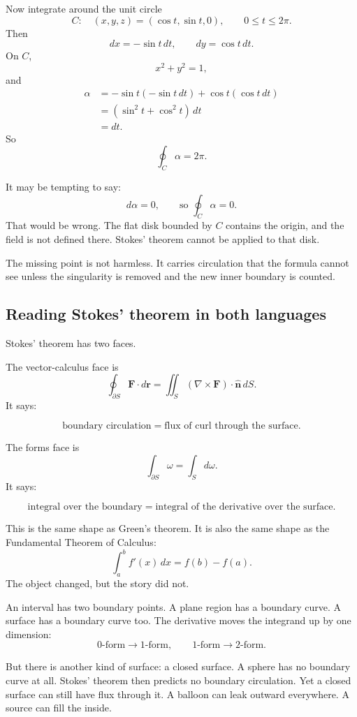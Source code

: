 Now integrate around the unit circle
\[
    C:\quad (x,y,z)=(\cos t,\sin t,0),
    \qquad 0\le t\le2\pi.
\]
Then
\[
    dx=-\sin t\,dt,
    \qquad
    dy=\cos t\,dt.
\]
On \(C\),
\[
    x^2+y^2=1,
\]
and
\[
\begin{aligned}
\alpha
&=
-\sin t(-\sin t\,dt)+\cos t(\cos t\,dt)\\
&=
(\sin^2t+\cos^2t)\,dt\\
&=
dt.
\end{aligned}
\]
So
\[
\boxed{
    \oint_C\alpha=2\pi.
}
\]

It may be tempting to say:
\[
    d\alpha=0,
    \qquad
    \text{so } \oint_C\alpha=0.
\]
That would be wrong.  The flat disk bounded by \(C\) contains the origin, and the field
is not defined there.  Stokes' theorem cannot be applied to that disk.

The missing point is not harmless.  It carries circulation that the formula cannot see
unless the singularity is removed and the new inner boundary is counted.

\subsection{Reading Stokes' theorem in both languages}

Stokes' theorem has two faces.

The vector-calculus face is
\[
\boxed{
    \oint_{\partial S}\mathbf F\cdot d\mathbf r
    =
    \iint_S(\nabla\times\mathbf F)\cdot\widehat{\mathbf n}\,dS.
}
\]
It says:

\[
\text{boundary circulation}
=
\text{flux of curl through the surface}.
\]

The forms face is
\[
\boxed{
    \int_{\partial S}\omega=\int_S d\omega.
}
\]
It says:

\[
\text{integral over the boundary}
=
\text{integral of the derivative over the surface}.
\]

This is the same shape as Green's theorem.  It is also the same shape as the
Fundamental Theorem of Calculus:
\[
    \int_a^b f'(x)\,dx=f(b)-f(a).
\]
The object changed, but the story did not.

An interval has two boundary points.  A plane region has a boundary curve.  A surface
has a boundary curve too.  The derivative moves the integrand up by one dimension:
\[
    0\text{-form}\to1\text{-form},
    \qquad
    1\text{-form}\to2\text{-form}.
\]

But there is another kind of surface: a closed surface.  A sphere has no boundary curve
at all.  Stokes' theorem then predicts no boundary circulation.  Yet a closed surface
can still have flux through it.  A balloon can leak outward everywhere.  A source can
fill the inside.

